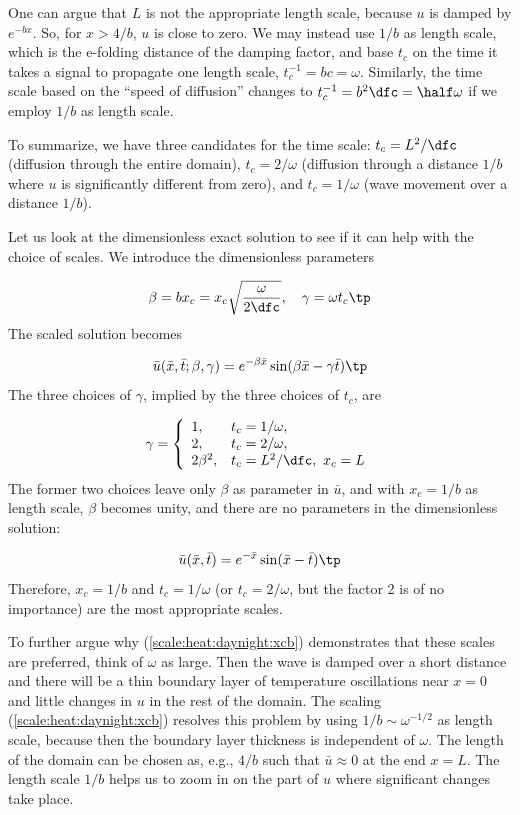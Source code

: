 \documentclass[graybox,envcountchap,sectrefs,final]{svmonodo}
\begin{document}
One can argue that $L$ is not the appropriate length scale, because
$u$ is damped by $e^{-bx}$. So, for $x > 4/b$, $u$ is close to zero.
We may instead use $1/b$ as length scale, which is the e-folding distance of the
damping factor, and base
$t_c$ on the time it takes a signal to propagate one length scale,
$t_c^{-1}=bc=\omega$. Similarly, the time scale based on
the ``speed of diffusion'' changes to
$t_c^{-1}= b^2\dfc = \half\omega$ if we employ $1/b$ as length scale.

To summarize, we have three candidates for the time scale:
$t_c=L^2/\dfc$ (diffusion through the entire domain), $t_c=2/\omega$
(diffusion through a distance $1/b$ where $u$ is significantly
different from zero), and $t_c=1/\omega$ (wave movement over a
distance $1/b$).

Let us look at the dimensionless exact solution to see if it can help
with the choice of scales.  We introduce the dimensionless parameters

\[ \beta = bx_c = x_c\sqrt{\frac{\omega}{2\dfc}},\quad
\gamma = \omega t_c\tp\]
The scaled solution becomes

\[ \bar u(\bar x, \bar t; \beta,\gamma) = e^{-\beta\bar x}\sin(\beta\bar x - \gamma\bar t)\tp\]
The three choices of $\gamma$, implied by the three choices of $t_c$, are

\begin{equation}
\gamma = \left\lbrace\begin{array}{ll}
1, & t_c=1/\omega,\\ 
2, & t_c = 2/\omega,\\ 
2\beta^2, & t_c = L^2/\dfc,\ x_c=L
\end{array}\right.
\label{scale:heat:daynight:gamma3}
\end{equation}
The former two choices leave only $\beta$ as parameter in $\bar u$,
and with $x_c=1/b$ as length scale, $\beta$ becomes unity, and there
are no parameters in the dimensionless solution:

\begin{equation}
\bar u(\bar x, \bar t) = e^{-\bar x}\sin(\bar x - \bar t)\tp
\label{scale:heat:daynight:xcb}
\end{equation}
Therefore, $x_c=1/b$ and $t_c=1/\omega$ (or $t_c=2/\omega$, but the
factor 2 is of no importance) are the most appropriate scales.

To further argue why (\ref{scale:heat:daynight:xcb}) demonstrates
that these scales are
preferred, think of
$\omega$ as large. Then the wave is damped over a short
distance and there will be a thin boundary layer of temperature
oscillations near $x=0$ and little changes in $u$ in the rest of
the domain. The scaling (\ref{scale:heat:daynight:xcb}) resolves
this problem by using $1/b \sim \omega^{-1/2}$ as length scale,
because then the boundary layer thickness is independent of
$\omega$. The length of the domain can be chosen as, e.g., $4/b$
such that $\bar u\approx 0$ at the end $x=L$. The length scale $1/b$
helps us to zoom in on the part of $u$ where significant changes
take place.
\end{document}

